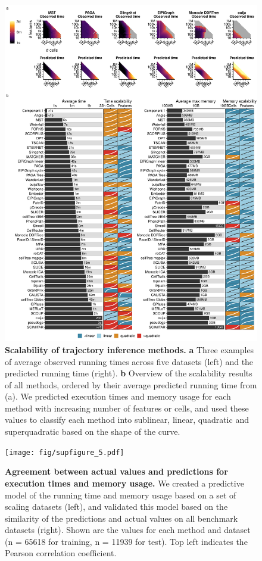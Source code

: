 \begin{figure}[tbh!]
	\centering\includegraphics[width=0.9\linewidth]{fig/supfigure_4.pdf}
	\caption{
		\textbf{Scalability of trajectory inference methods.}
		\textbf{a} Three examples of average observed running times across five datasets (left) and the predicted running time (right). \textbf{b} Overview of the scalability results of all methods, ordered by their average predicted running time from (a). We predicted execution times and memory usage for each method with increasing number of features or cells, and used these values to classify each method into sublinear, linear, quadratic and superquadratic based on the shape of the curve.
	}
	\label{fig:supfigure_4}
\end{figure}


\begin{figure}[tbh!]
	\centering\texttt{[image: fig/supfigure\_5.pdf]}
	\caption{
		\textbf{Agreement between actual values and predictions for execution times and memory usage.}
		We created a predictive model of the running time and memory usage based on a set of scaling datasets (left), and validated this model based on the similarity of the predictions and actual values on all benchmark datasets (right). Shown are the values for each method and dataset (n = 65618 for training, n = 11939 for test). Top left indicates the Pearson correlation coefficient.
	}
	\label{fig:supfigure_5}
\end{figure}

